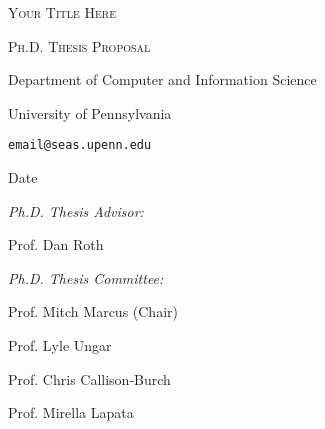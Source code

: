 \documentclass[12pt]{article}
\newcommand{\dobib}{
    
    
}
\begin{document}
    \renewcommand{\dobib}{} %

    {\centering \scshape\LARGE {\color{red} Your Title Here} \par}
    {\centering \scshape\large Ph.D. Thesis Proposal \par}
    
    \vspace{1cm}
    
    { \par}
    {\centering  Department of Computer and Information Science \par}
    {\centering  University of Pennsylvania \par}
    {\centering  \texttt{email@seas.upenn.edu} \par}
    
    \vspace{12pt}
    {\centering \large {\color{red} Date} \par}
    
    \vspace{1cm}
    
    \textit{Ph.D. Thesis Advisor:}
    
    {\color{red} Prof. Dan Roth}
    
    \vspace{12pt}
    \textit{Ph.D. Thesis Committee:}
    
    {\color{red} Prof. Mitch Marcus (Chair)}
    
    {\color{red} Prof. Lyle Ungar}
    
    {\color{red} Prof. Chris Callison-Burch}
    
    {\color{red} Prof. Mirella Lapata}
    
    
    
    \pagebreak
    \tableofcontents
    \pagebreak
    
    \pagebreak
    
    
\end{document}
